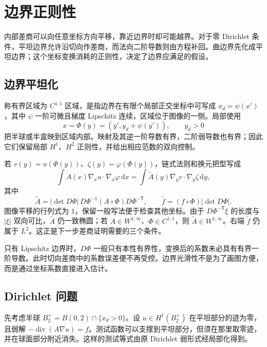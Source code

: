 \section{边界正则性}
\label{b2:sec:1603}

内部差商可以向任意坐标方向平移，靠近边界时却可能越界。对于零 Dirichlet 条件，平坦边界允许沿切向作差商，而法向二阶导数则由方程补回。曲边界先化成平坦边界；这个坐标变换消耗的正则性，决定了边界应满足的假设。

\subsection{边界平坦化}
\label{b2:subsec:160301}

称有界区域为 \(C^{1,1}\) 区域，是指边界在有限个局部正交坐标中可写成 \(x_d=\psi(x')\)，其中 \(\psi\) 一阶可微且梯度 Lipschitz 连续，区域位于图像的一侧。局部使用
\[x=\Phi(y)=(y',y_d+\psi(y')),\qquad y_d>0\]
把半球或半盒映到区域内部。映射及其逆一阶导数有界，二阶弱导数也有界；因此它们保留局部 \(H^1\)、\(H^2\) 正则性，并给出相应范数的双向控制。

\ProseParagraphBreak

若 \(v(y)=u(\Phi(y))\)、\(\zeta(y)=\varphi(\Phi(y))\)，链式法则和换元把型写成
\[
 \int A(x)\nabla_xu\cdot\nabla_x\varphi\,\mathrm dx
 =\int\widetilde A(y)\nabla_yv\cdot\nabla_y\zeta\,\mathrm dy,
\]
其中
\[\widetilde A=|\det D\Phi|\,D\Phi^{-1}(A\circ\Phi)D\Phi^{-\mathsf T},
 \qquad\widetilde f=(f\circ\Phi)|\det D\Phi|.\]
图像平移的行列式为 \(1\)，保留一般写法便于检查其他坐标。由于 \(D\Phi^{-\mathsf T}\xi\) 的长度与 \(|\xi|\) 双向可比，\(\widetilde A\) 仍一致椭圆；若 \(A\in W^{1,\infty}\)、\(\Phi\in C^{1,1}\)，则 \(\widetilde A\in W^{1,\infty}\)。右端 \(\widetilde f\) 仍属于 \(L^2\)。这正是下一步差商证明需要的三个条件。

\ProseParagraphBreak

只有 Lipschitz 边界时，\(D\Phi\) 一般只有本性有界性，变换后的系数未必具有有界一阶导数。此时切向差商中的系数误差便不再受控。边界光滑性不是为了画图方便，而是通过坐标系数直接进入估计。

\subsection{Dirichlet 问题}
\label{b2:subsec:160302}

先考虑半球 \(B_2^+=B(0,2)\cap\{x_d>0\}\)。设 \(u\in H^1(B_2^+)\) 在平坦部分的迹为零，且弱解 \(-\operatorname{div}(A\nabla u)=f\)。测试函数可以支撑到平坦部分，但须在那里取零迹，并在球面部分附近消失。这样的测试等式由原 Dirichlet 弱形式经局部化得到。

